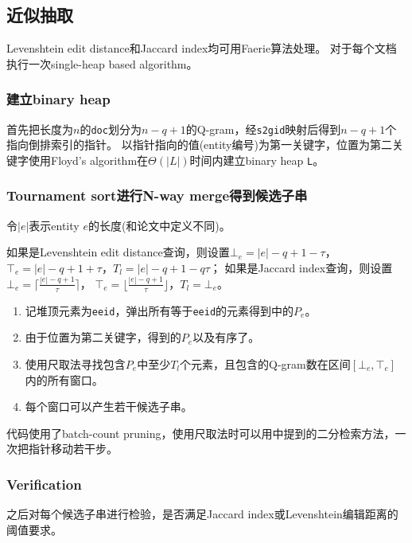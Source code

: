 \subsection{近似抽取}

Levenshtein edit distance和Jaccard index均可用Faerie算法处理。
对于每个文档执行一次single-heap based algorithm。

\subsubsection{建立binary heap}

首先把长度为$n$的\texttt{doc}划分为$n-q+1$的Q-gram，经\texttt{s2gid}映射后得到$n-q+1$个指向倒排索引的指针。
以指针指向的值(entity编号)为第一关键字，位置为第二关键字使用Floyd's algorithm在$\Theta(|L|)$时间内建立binary heap \texttt{L}。

\subsubsection{Tournament sort进行N-way merge得到候选子串}

令$|e|$表示entity $e$的长度(和论文中定义不同)。

如果是Levenshtein edit distance查询，则设置$\bot_e=|e|-q+1-\tau$，
$\top_e=|e|-q+1+\tau$，$T_l=|e|-q+1-q\tau$；
如果是Jaccard index查询，则设置$\bot_e=\lceil\frac{|e|-q+1}{\tau}\rceil$，
$\top_e=\lfloor\frac{|e|-q+1}{\tau}\rfloor$，$T_l=\bot_e$。

\begin{enumerate}
  \item 记堆顶元素为\texttt{eeid}，弹出所有等于\texttt{eeid}的元素得到\cite{faerie}中的$P_e$。
  \item 由于位置为第二关键字，得到的$P_e$以及有序了。
  \item 使用尺取法寻找包含$P_e$中至少$T_l$个元素，且包含的Q-gram数在区间$[\bot_e,\top_e]$内的所有窗口。
  \item 每个窗口可以产生若干候选子串。
\end{enumerate}

代码使用了batch-count pruning，使用尺取法时可以用\cite{faerie}中提到的二分检索方法，一次把指针移动若干步。

\subsubsection{Verification}

之后对每个候选子串进行检验，是否满足Jaccard index或Levenshtein编辑距离的阈值要求。

